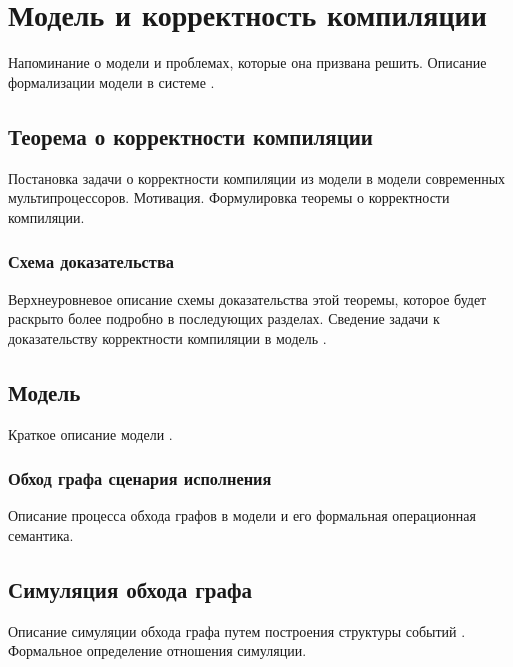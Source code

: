 \chapter{Модель \Wkm и корректность компиляции}
\label{ch:weakestmo-imm}

Напоминание о модели \Wkm и проблемах, которые она призвана решить.
Описание формализации модели \Wkm в системе \coq.

\section{Теорема о корректности компиляции}

Постановка задачи о корректности компиляции
из модели \Wkm в модели современных мультипроцессоров. Мотивация.
Формулировка теоремы о корректности компиляции. 

\subsection{Схема доказательства}

Верхнеуровневое описание схемы доказательства этой теоремы,
которое будет раскрыто более подробно в последующих разделах.
Сведение задачи к доказательству корректности компиляции в модель \IMM. 

\section{Модель \IMM}

Краткое описание модели \IMM. 

\subsection{Обход графа сценария исполнения}

Описание процесса обхода графов в модели \IMM
и его формальная операционная семантика. 

\section{Симуляция обхода графа \IMM}

Описание симуляции обхода графа \IMM путем построения структуры событий \Wkm.
Формальное определение отношения симуляции. 
